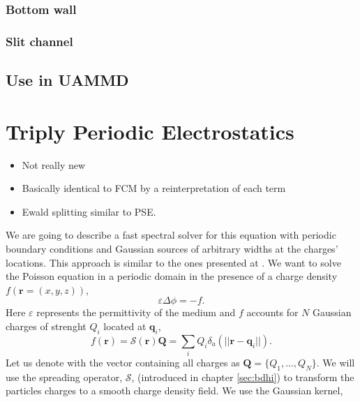 \documentclass[ twoside,openright,titlepage,numbers=noenddot,%
headinclude,footinclude,cleardoublepage=empty,abstract=on,
BCOR=5mm,paper=a4,fontsize=11pt, dvipsnames
]{scrreprt}
\renewcommand{\vec}[1]{\bm{#1}}
\newcommand{\oper}[1]{\mathcal{#1}}
\newcommand{\ppos}{q}
\newcommand{\fpos}{r}
\begin{document}
\subsection*{Bottom wall}
\subsection*{Slit channel}

\section*{Use in UAMMD}




\chapter{Triply Periodic Electrostatics} \label{ch:tppoisson}
\begin{itemize}
\item Not really new
\item Basically identical to FCM by a reinterpretation of each term
\item Ewald splitting similar to PSE.
\end{itemize}
We are going to describe a fast spectral solver for this equation with periodic boundary conditions and Gaussian sources of arbitrary widths at the charges' locations. This approach is similar to the ones presented at \cite{Lindbo2011,Tornberg2015}.
We want to solve the Poisson equation in a periodic domain in the presence of a charge density $f(\vec{\fpos}=(x,y,z))$,
\begin{equation}
  \label{eq:ttpoisson}
 \varepsilon\Delta\phi=-f.
\end{equation}
Here $\varepsilon$ represents the permittivity of the medium and $f$ accounts for $N$ Gaussian charges of strenght $Q_i$ located at $\vec{\ppos}_i$,
\begin{equation}
  \label{eq:tppoisson_cdens}
  f(\vec{\fpos})= \oper{S}(\vec{\fpos})\vec{Q} = \sum_iQ_i\delta_a(||\vec{\fpos}-\vec{\ppos}_i||).
\end{equation}
Let us denote with the vector containing all charges as $\vec{Q} = \{Q_1,\dots,Q_N\}$.
We will use the spreading operator, $\oper{S}$, (introduced in chapter \ref{sec:bdhi}) to transform the particles charges to a smooth charge density field. We use the Gaussian kernel,
\end{document}
